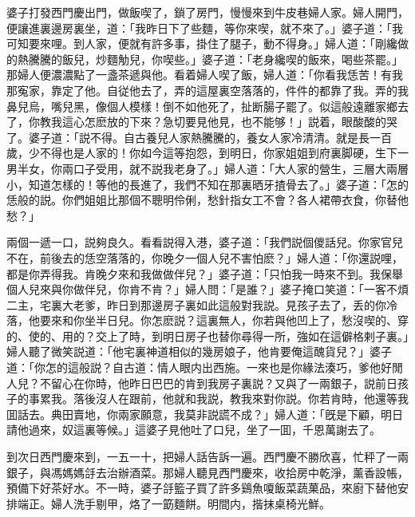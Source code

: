 婆子打發西門慶出門，做飯喫了，鎖了房門，慢慢來到牛皮巷婦人家。婦人開門，便讓進裏邊房裏坐，道：「我昨日下了些麵，等你來喫，就不來了。」婆子道：「我可知要來哩。到人家，便就有許多事，掛住了腿子，動不得身。」婦人道：「剛纔做的熱騰騰的飯兒，炒麵觔兒，你喫些。」婆子道：「老身纔喫的飯來，喝些茶罷。」那婦人便濃濃點了一盞茶遞與他。看着婦人喫了飯，婦人道：「你看我恁苦！有我那寃家，靠定了他。自従他去了，弄的這屋裏空落落的，件件的都靠了我。弄的我鼻兒烏，嘴兒黑，像個人模樣！倒不如他死了，扯断腸子罷了。似這般遠離家鄉去了，你教我這心怎麽放的下來？急切要見他見，也不能够！」説着，眼酸酸的哭了。婆子道：「説不得。自古養兒人家熱騰騰的，養女人家冷清清。就是長一百歲，少不得也是人家的！你如今這等抱怨，到明日，你家姐姐到府裏脚硬，生下一男半女，你兩口子受用，就不説我老身了。」婦人道：「大人家的營生，三層大兩層小，知道怎樣的！等他的長進了，我們不知在那裏晒牙揸骨去了。」婆子道：「怎的恁般的説。你們姐姐比那個不聰明伶俐，愁針指女工不會？各人裙帶衣食，你替他愁？」

兩個一遞一口，説夠良久。看看説得入港，婆子道：「我們説個儍話兒。你家官兒不在，前後去的恁空落落的，你晚夕一個人兒不害怕麽？」婦人道：「你還説哩，都是你弄得我。肯晚夕來和我做做伴兒？」婆子道：「只怕我一時來不到。我保舉個人兒來與你做伴兒，你肯不肯？」婦人問：「是誰？」婆子掩口笑道：「一客不煩二主，宅裏大老爹，昨日到那邊房子裏如此這般對我説。見孩子去了，丢的你冷落，他要來和你坐半日兒。你怎麽説？這裏無人，你若與他凹上了，愁沒喫的、穿的、使的、用的？交上了時，到明日房子也替你尋得一所，強如在這僻格剌子裏。」婦人聽了微笑説道：「他宅裏神道相似的幾房娘子，他肯要俺這醜貨兒？」婆子道：「你怎的這般説？自古道：情人眼内出西施。一來也是你緣法湊巧，爹他好閒人兒？不留心在你時，他昨日巴巴的肯到我房子裏説？又與了一兩銀子，説前日孩子的事累我。落後沒人在跟前，他就和我説，教我來對你説。你若肯時，他還等我囬話去。典田賣地，你兩家願意，我莫非説謊不成？」婦人道：「旣是下顧，明日請他過來，奴這裏等候。」這婆子見他吐了口兒，坐了一囬，千恩萬謝去了。

到次日西門慶來到，一五一十，把婦人話告訴一遍。西門慶不勝欣喜，忙秤了一兩銀子，與馮媽媽㧱去治辦酒菜。那婦人聽見西門慶來，收拾房中乾淨，薰香設帳，預備下好茶好水。不一時，婆子㧱籃子買了許多鷄魚嗄飯菜蔬菓品，來廚下替他安排端正。婦人洗手剔甲，烙了一筯麵餅。明間内，揩抹桌椅光鮮。


